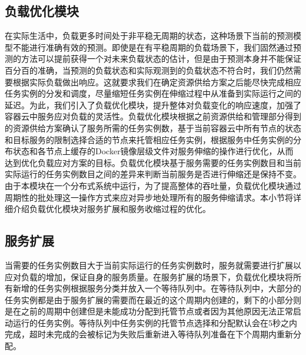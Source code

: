 \subsection{负载优化模块}\label{sec:scheduler}
在实际生活中，负载更多时间处于非平稳无周期的状态，这种场景下当前的预测模型不能进行准确有效的预测。即使是在有平稳周期的负载场景下，我们固然通过预测的方法可以提前获得一个对未来负载状态的估计，但是由于预测本身并不能保证百分百的准确，当预测的负载状态和实际观测到的负载状态不符合时，我们仍然需要根据实际负载做出响应。这就要求我们在确定资源供给方案之后能尽快完成相应任务实例的分发和调度，尽量缩短任务实例在伸缩过程中从准备到实际运行之间的延迟。为此，我们引入了负载优化模块，提升整体对负载变化的响应速度，加强了容器云中服务应对负载的灵活性。负载优化模块根据之前资源供给和管理部分得到的资源供给方案确认了服务所需的任务实例数，基于当前容器云中所有节点的状态和目标服务的限制选择合适的节点来托管相应任务实例，根据服务中任务实例的分布状态和各节点上缓存的Docker镜像层级文件对服务伸缩的操作进行优化，从而达到优化负载应对方案的目标。负载优化模块基于服务需要的任务实例数目和当前实际运行的任务实例数目之间的差异来判断当前服务是否进行伸缩还是保持不变。由于本模块在一个分布式系统中运行，为了提高整体的吞吐量，负载优化模块通过周期性的批处理这一操作方式来应对异步地处理所有的服务伸缩请求。本小节将详细介绍负载优化模块对服务扩展和服务收缩过程的优化。

\subsection{服务扩展}\label{sec:scaleout}
当需要的任务实例数目大于当前实际运行的任务实例数时，服务就需要进行扩展以应对负载的增加，保证自身的服务质量。在服务扩展的场景下，负载优化模块将所有新增的任务实例根据服务分类并放入一个等待队列中。在等待队列中，大部分的任务实例都是由于服务扩展的需要而在最近的这个周期内创建的，剩下的小部分则是在之前的周期中创建但是未能成功分配到托管节点或者因为其他原因无法正常启动运行的任务实例。等待队列中任务实例的托管节点选择和分配默认会在5秒之内完成，超时未完成的会被标记为失败后重新进入等待队列准备在下个周期内重新分配。

